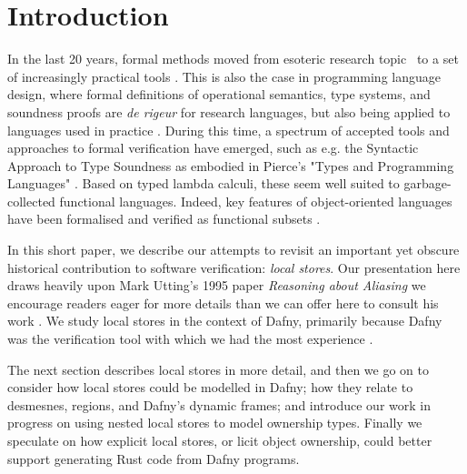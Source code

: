 \section{Introduction}

In the last 20 years, formal methods moved from esoteric research
topic~\cite{CoqTute11} to a set of increasingly practical tools
\cite{alloybook,tlabook,spinbook,dafny2023}.  This is also the case in
programming language design, where formal definitions of operational
semantics, type systems, and soundness proofs are \textit{de rigeur}
for research languages, but also being applied to languages used in
practice \cite{RustBelt18,djpRust}.  During this time, a spectrum of
accepted tools and approaches to formal verification have emerged,
such as e.g. the Syntactic Approach to Type Soundness
\cite{wright_syntactic_1994} as embodied in Pierce's "Types and
Programming Languages" \cite{pierce_types_2002}.  Based on typed
lambda calculi, these seem well suited to garbage-collected functional
languages. Indeed, key features of object-oriented languages have been
formalised and verified as functional subsets
\cite{IgaPieWadTOPLAS01}.
 
In this short paper, we describe our attempts to revisit an important
yet obscure historical contribution to software verification:
\textit{local stores}. Our presentation here draws heavily upon Mark
Utting's 1995 paper \textit{Reasoning about Aliasing} we encourage
readers eager for more details than we can offer here to consult his
work \cite{utting1995,utting1998}.  We study local stores in the
context of Dafny, primarily because Dafny was the verification tool
with which we had the most experience
\cite{MPTP,learn2024,flags2024,dafnydala2024}.

The next section describes local stores in more detail, and then we go
on to consider how local stores could be modelled in Dafny; how they
relate to desmesnes, regions, and Dafny's dynamic frames; and
introduce our work in progress on using nested local stores to model
ownership types.  Finally we speculate on how explicit local stores,
or licit object ownership, could better support generating Rust code
from Dafny programs.

